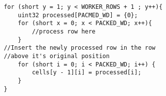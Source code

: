 \begin{minipage}{0.5\textwidth}
    \begin{verbatim}
    for (short y = 1; y < WORKER_ROWS + 1 ; y++){
        uint32 processed[PACMED_WD] = {0};
        for (short x = 0; x < PACKED_WD; x++){
            //process row here
        }
    //Insert the newly processed row in the row 
    //above it's original position
        for (short i = 0; i < PACKED_WD; i++) {
            cells[y - 1][i] = processed[i];
        }
    }
    \end{verbatim}
\end{minipage}
